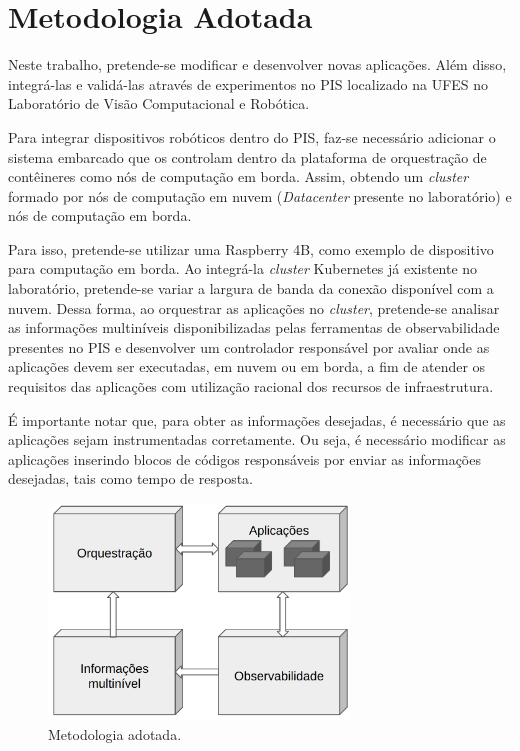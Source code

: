\section{Metodologia Adotada}

Neste trabalho, pretende-se modificar e desenvolver novas aplicações. Além disso, integrá-las e validá-las através de experimentos no PIS localizado na UFES no Laboratório de Visão Computacional e Robótica.

Para integrar dispositivos robóticos dentro do PIS, faz-se necessário adicionar o sistema embarcado que os controlam dentro da plataforma de orquestração de contêineres como nós de computação em borda. Assim, obtendo um \textit{cluster} formado por nós de computação em nuvem (\textit{Datacenter} presente no laboratório) e nós de computação em borda.

Para isso, pretende-se utilizar uma Raspberry 4B, como exemplo de dispositivo para computação em borda. Ao integrá-la  \textit{cluster} Kubernetes já existente no laboratório, pretende-se variar a largura de banda da conexão disponível com a nuvem. Dessa forma, ao orquestrar as aplicações no \textit{cluster}, pretende-se analisar as informações multiníveis disponibilizadas pelas ferramentas de observabilidade presentes no PIS e desenvolver um controlador responsável por avaliar onde as aplicações devem ser executadas, em nuvem ou em borda, a fim de atender os requisitos das aplicações com utilização racional dos recursos de infraestrutura.

É importante notar que, para  obter as informações desejadas, é necessário que as aplicações sejam instrumentadas corretamente. Ou seja, é necessário modificar as aplicações inserindo blocos de códigos responsáveis por enviar as informações desejadas, tais como tempo de resposta.

\begin{figure}[ht]
    \centering
    \includegraphics[width=80mm]{images/metodologia.png}
    \caption{Metodologia adotada.}
    \label{fig:metodologia}
\end{figure}



